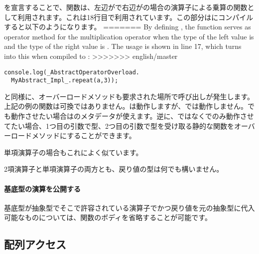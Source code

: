 を宣言することで、関数は、左辺がで右辺がの場合の\expr{*}演算子による乗算の関数として利用されます。これは18行目で利用されています。この部分はにコンパイルすると以下のようになります。
=======
By defining , the function  serves as operator method for the multiplication \expr{*} operator when the type of the left value is  and the type of the right value is . The usage is shown in line 17, which turns into this when compiled to :
>>>>>>> english/master

\begin{lstlisting}
console.log(_AbstractOperatorOverload.
  MyAbstract_Impl_.repeat(a,3));
\end{lstlisting}


と同様に、オーバーロードメソッドも要求された場所で呼び出しが発生します。上記の例の関数は可換ではありません。は動作しますが、では動作しません。でも動作させたい場合はのメタデータが使えます。逆に、ではなくでのみ動作させてたい場合、1つ目の引数で型、2つ目の引数で型を受け取る静的な関数をオーバーロードメソッドにすることができます。

単項演算子の場合もこれによく似ています。


2項演算子と単項演算子の両方とも、戻り値の型は何でも構いません。

\paragraph{基底型の演算を公開する}

基底型が抽象型でそこで許容されている演算子でかつ戻り値を元の抽象型に代入可能なものについては、関数のボディを省略することが可能です。



\subsection{配列アクセス}
\label{types-abstract-array-access}

